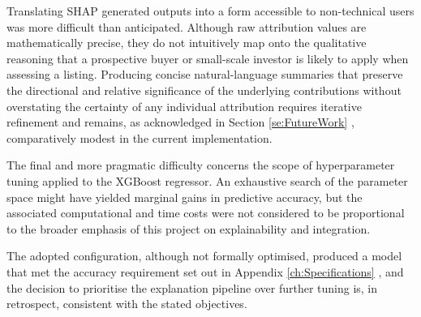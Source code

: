 Translating SHAP generated outputs into a form accessible to non-technical users was more difficult than anticipated. Although raw attribution values are mathematically precise, they do not intuitively map onto the qualitative reasoning that a prospective buyer or small-scale investor is likely to apply when assessing a listing. 
Producing concise natural-language summaries that preserve the directional and relative significance of the underlying contributions without overstating the certainty of any individual attribution requires iterative refinement and remains, as acknowledged in Section \ref{se:FutureWork} , comparatively modest in the current implementation.

The final and more pragmatic difficulty concerns the scope of hyperparameter tuning applied to the XGBoost regressor. An exhaustive search of the parameter space might have yielded marginal gains in predictive accuracy, but the associated computational and time costs were not considered to be proportional to the broader emphasis of this project on explainability and integration. 

The adopted configuration, although not formally optimised, produced a model that met the accuracy requirement set out in Appendix \ref{ch:Specifications} , and the decision to prioritise the explanation pipeline over further tuning is, in retrospect, consistent with the stated objectives.